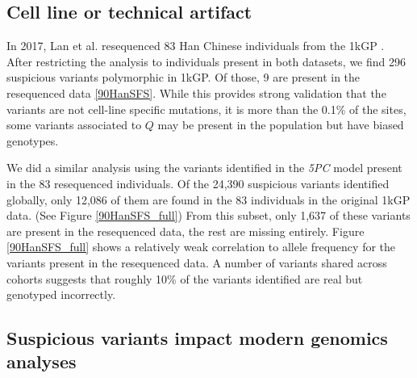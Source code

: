 \documentclass[9pt,lineno]{elife}
\begin{document}
\subsection{Cell line or technical artifact}
%


In 2017, Lan et al. resequenced 83 Han Chinese individuals from the 1kGP \citep{Lan2017}.
After restricting the analysis to individuals present in both datasets, we find 296 suspicious variants polymorphic in 1kGP. Of those, 9 are present in the resequenced data \ref{90HanSFS}.
While this provides strong validation that the variants are not cell-line specific mutations, it is more than the 0.1\% of the sites, some variants associated to $Q$ may be present in the population but have biased genotypes.

We did a similar analysis using the variants identified in the \textit{5PC} model present in the 83 resequenced individuals.
Of the 24,390 suspicious variants identified globally, only 12,086 of them are found in the 83 individuals in the original 1kGP data. (See Figure \ref{90HanSFS_full})
From this subset, only 1,637 of these variants are present in the resequenced data, the rest are missing entirely.
Figure \ref{90HanSFS_full} shows a relatively weak correlation to allele frequency for the variants present in the resequenced data.
A number of variants shared across cohorts suggests that roughly 10\% of the variants identified are real but genotyped incorrectly.

\subsection{Suspicious variants impact modern genomics analyses}
\end{document}
